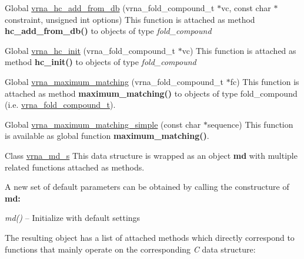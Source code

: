 \begin{DoxyRefList}
\item[Global \mbox{\hyperlink{group__hard__constraints_ga5b4de3247b67358080c176b94591a8e6}{vrna\+\_\+hc\+\_\+add\+\_\+from\+\_\+db}} (vrna\+\_\+fold\+\_\+compound\+\_\+t $\ast$vc, const char $\ast$constraint, unsigned int options)]\label{wrappers__wrappers000028}%
%
 This function is attached as method {\bfseries{hc\+\_\+add\+\_\+from\+\_\+db()}} to objects of type {\itshape fold\+\_\+compound}  
\item[Global \mbox{\hyperlink{group__hard__constraints_ga36ff456c43bf920629cee5a236e4f0ff}{vrna\+\_\+hc\+\_\+init}} (vrna\+\_\+fold\+\_\+compound\+\_\+t $\ast$vc)]\label{wrappers__wrappers000024}%
%
 This function is attached as method {\bfseries{hc\+\_\+init()}} to objects of type {\itshape fold\+\_\+compound}  
\item[Global \mbox{\hyperlink{mm_8h_a242e65bd5031f05fccd1133c5be0b75a}{vrna\+\_\+maximum\+\_\+matching}} (vrna\+\_\+fold\+\_\+compound\+\_\+t $\ast$fc)]\label{wrappers__wrappers000004}%
%
 This function is attached as method {\bfseries{maximum\+\_\+matching()}} to objects of type {\ttfamily fold\+\_\+compound} (i.\+e. \mbox{\hyperlink{group__fold__compound_ga1b0cef17fd40466cef5968eaeeff6166}{vrna\+\_\+fold\+\_\+compound\+\_\+t}}).  
\item[Global \mbox{\hyperlink{mm_8h_a25e2bf03fe5711c9c3a3828a14ef961e}{vrna\+\_\+maximum\+\_\+matching\+\_\+simple}} (const char $\ast$sequence)]\label{wrappers__wrappers000003}%
%
 This function is available as global function {\bfseries{maximum\+\_\+matching()}}.  
\item[Class \mbox{\hyperlink{group__model__details}{vrna\+\_\+md\+\_\+s}} ]\label{wrappers__wrappers000092}%
%
 This data structure is wrapped as an object {\bfseries{md}} with multiple related functions attached as methods.

A new set of default parameters can be obtained by calling the constructure of {\bfseries{md\+:}} ~\newline

\begin{DoxyItemize}
\item {\itshape md()} -- Initialize with default settings
\end{DoxyItemize}

The resulting object has a list of attached methods which directly correspond to functions that mainly operate on the corresponding {\itshape C} data structure\+:~\newline


\end{DoxyRefList}
